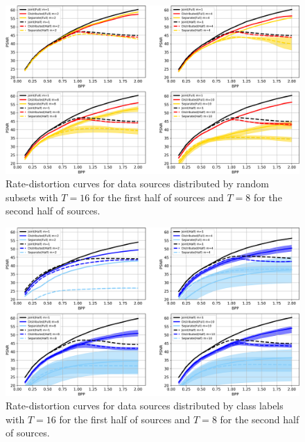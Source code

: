 \documentclass[10pt,twocolumn,letterpaper]{article}
\begin{document}
\begin{figure}
\begin{center}
\includegraphics[width=0.8\linewidth]{figure/half_subset_band.png}
\end{center}
	\vspace{-0.2cm}
   \caption{Rate-distortion curves for data sources distributed by random subsets with $T=16$ for the first half of sources and $T=8$ for the second half of sources.}
   \vspace{-0.2cm}
\label{fig_6}
\end{figure}

\begin{figure}
\begin{center}
\includegraphics[width=0.8\linewidth]{figure/half_class_band.png}
\end{center}
	\vspace{-0.2cm}
   \caption{Rate-distortion curves for data sources distributed by class labels with $T=16$ for the first half of sources and $T=8$ for the second half of sources.}
   \vspace{-0.2cm}
\label{fig_7}
\end{figure}
\end{document}
